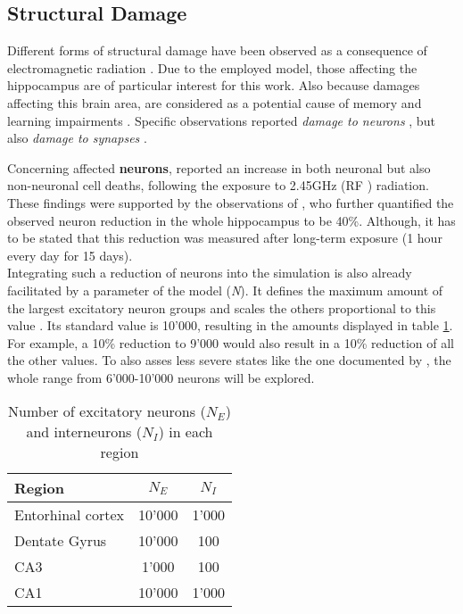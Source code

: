     \subsection{Structural Damage}
    Different forms of structural damage have been observed as a consequence of electromagnetic radiation \cite{Shahin.2015} \cite{Tan.2017}. Due to the employed model, those affecting the hippocampus are of particular interest for this work. Also because damages affecting this brain area, are considered as a potential cause of memory and learning impairments \cite{Narayanan.2019}. Specific observations reported \textit{damage to neurons} \cite{Shahin.2015} \cite{Altun.2017}, but also \textit{damage to synapses} \cite{Tan.2017} \cite{Xu.2006}.
    
    Concerning affected \textbf{neurons}, \textcite{Shahin.2015} reported an increase in both neuronal but also non-neuronal cell deaths, following the exposure to 2.45GHz (RF \cite{BORTKIEWICZ.2019}) radiation. These findings were supported by the observations of \textcite{Altun.2017}, who further quantified the observed neuron reduction in the whole hippocampus to be 40\%. Although, it has to be stated that this reduction was measured after long-term exposure (1 hour every day for 15 days).\\
    Integrating such a reduction of neurons into the simulation is also already facilitated by a parameter of the model (\textit{N}). It defines the maximum amount of the largest excitatory neuron groups and scales the others proportional to this value \cite{HippSimModel.2}. Its standard value is 10'000, resulting in the amounts displayed in table \ref{tab:population_sizes}. For example, a 10\% reduction to 9'000 would also result in a 10\% reduction of all the other values. To also asses less severe states like the one documented by \textcite{Altun.2017}, the whole range from 6'000-10'000 neurons will be explored. 

    \begin{table}[h]
        \centering
            \begin{tabular}{@{}lcc@{}}
                \toprule
                Region & $N_E$ & $N_I$ \\ 
                \midrule
                Entorhinal cortex & 10'000 & 1'000 \\
                Dentate Gyrus & 10'000 & 100 \\
                CA3 & 1'000 & 100 \\
                CA1 & 10'000 & 1'000 \\ 
                \bottomrule
            \end{tabular}
        \caption{Number of excitatory neurons (\(N_E\)) and interneurons (\(N_I\)) in each region \cite{Aussel.2018}}
        \label{tab:population_sizes}
    \end{table}
    

